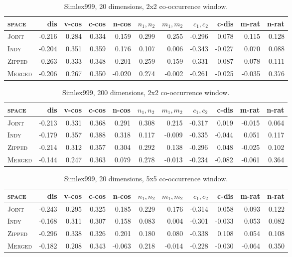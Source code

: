 \begin{table}
\begin{tabular}{lrrrrrrrrrr}
\hline
\textsc{space} & dis & v-cos & c-cos & n-cos & $n_1,n_2$ & $m_1,m_2$ & $c_1,c_2$ & c-dis & m-rat & n-rat \\
\hline
\textsc{Joint} & -0.216 & 0.284 & 0.334 & 0.159 & 0.299 & 0.255 & -0.296 & 0.078 & 0.115 & 0.128 \\
\textsc{Indy} & -0.204 & 0.351 & 0.359 & 0.176 & 0.107 & 0.006 & -0.343 & -0.027 & 0.070 & 0.088 \\
\textsc{Zipped} & -0.263 & 0.333 & 0.348 & 0.201 & 0.259 & 0.159 & -0.331 & 0.087 & 0.078 & 0.111 \\
\textsc{Merged} & -0.206 & 0.267 & 0.350 & -0.020 & 0.274 & -0.002 & -0.261 & -0.025 & -0.035 & 0.376 \\
\hline
\end{tabular}
\caption{Simlex999, 20 dimensions, 2x2 co-occurrence window.}
\end{table}

\begin{table}
\begin{tabular}{lrrrrrrrrrr}
\hline
\textsc{space} & dis & v-cos & c-cos & n-cos & $n_1,n_2$ & $m_1,m_2$ & $c_1,c_2$ & c-dis & m-rat & n-rat \\
\hline
\textsc{Joint} & -0.213 & 0.331 & 0.368 & 0.291 & 0.308 & 0.215 & -0.317 & 0.019 & -0.015 & 0.064 \\
\textsc{Indy} & -0.179 & 0.357 & 0.388 & 0.318 & 0.117 & -0.009 & -0.335 & -0.044 & 0.051 & 0.117 \\
\textsc{Zipped} & -0.214 & 0.312 & 0.357 & 0.304 & 0.292 & 0.138 & -0.296 & 0.048 & -0.025 & 0.102 \\
\textsc{Merged} & -0.144 & 0.247 & 0.363 & 0.079 & 0.278 & -0.013 & -0.234 & -0.082 & -0.061 & 0.364 \\
\hline
\end{tabular}
\caption{Simlex999, 200 dimensions, 2x2 co-occurrence window.}
\end{table}

\begin{table}
\begin{tabular}{lrrrrrrrrrr}
\hline
\textsc{space} & dis & v-cos & c-cos & n-cos & $n_1,n_2$ & $m_1,m_2$ & $c_1,c_2$ & c-dis & m-rat & n-rat \\
\hline
\textsc{Joint} & -0.243 & 0.295 & 0.325 & 0.185 & 0.229 & 0.176 & -0.314 & 0.058 & 0.093 & 0.122 \\
\textsc{Indy} & -0.168 & 0.311 & 0.307 & 0.158 & 0.083 & 0.004 & -0.301 & -0.033 & 0.053 & 0.082 \\
\textsc{Zipped} & -0.296 & 0.338 & 0.326 & 0.201 & 0.180 & 0.080 & -0.338 & 0.108 & 0.054 & 0.108 \\
\textsc{Merged} & -0.182 & 0.208 & 0.343 & -0.063 & 0.218 & -0.014 & -0.228 & -0.030 & -0.064 & 0.350 \\
\hline
\end{tabular}
\caption{Simlex999, 20 dimensions, 5x5 co-occurrence window.}
\end{table}

